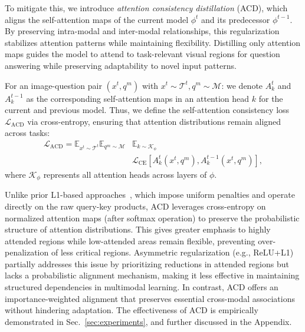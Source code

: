 To mitigate this, we introduce \textit{attention consistency distillation} (ACD), which aligns the self-attention maps of the current model $\phi^t$ and its predecessor $\phi^{t-1}$. By preserving intra-modal and inter-modal relationships, this regularization stabilizes attention patterns while maintaining flexibility. Distilling only attention maps guides the model to attend to task-relevant visual regions for question answering while preserving adaptability to novel input patterns.

For an image-question pair $(x^t, q^m)$ with $x^t \sim \mathcal{T}^t, q^m \sim \mathcal{M}$: we denote \( A_k^t \) and \( A_k^{t-1} \) as the corresponding self-attention maps in an attention head $k$ for the current and previous model. Thus, we define the self-attention consistency loss $\mathcal{L}_{\text{ACD}}$ via cross-entropy, ensuring that attention distributions remain aligned across tasks:
\begin{equation}
\begin{split}
  \mathcal{L}_{\text{ACD}} = \mathbb{E}_{x^t\sim \mathcal{T}^t}\mathbb{E}_{q^m\sim \mathcal{M}}&\mathbb{E}_{k\sim \mathcal{K}_\phi}\\
  &\mathcal{L}_{\text{CE}}\left[A_{k}^{t}(x^t,q^m),A_{k}^{t-1}(x^t,q^m)\right],
\end{split}
\end{equation}
where $\mathcal{K}_\phi$ represents all attention heads across layers of $\phi$.

Unlike prior L1-based approaches~\citep{dhar2019learning, pelosin2022towards}, which impose uniform penalties and operate directly on the raw query-key products, ACD leverages cross-entropy on normalized attention maps (after softmax operation) to preserve the probabilistic structure of attention distributions. This gives greater emphasis to highly attended regions while low-attended areas remain flexible, preventing over-penalization of less critical regions. Asymmetric regularization (e.g., ReLU+L1) ~\citep{pelosin2022towards} partially addresses this issue by prioritizing reductions in attended regions but lacks a probabilistic alignment mechanism, making it less effective in maintaining structured dependencies in multimodal learning. In contrast, ACD offers an importance-weighted alignment that preserves essential cross-modal associations without hindering adaptation. The effectiveness of ACD is empirically demonstrated in Sec.~\ref{sec:experiments}, and further discussed in the Appendix.


